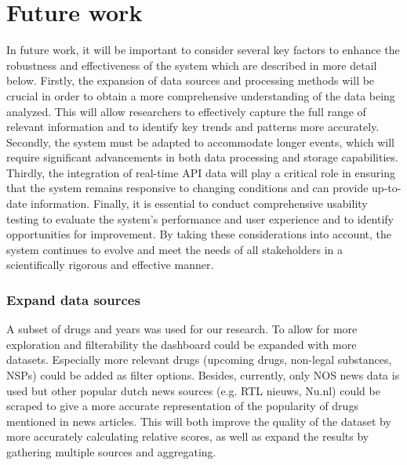 \section{Future work}

In future work, it will be important to consider several key factors to enhance the robustness and effectiveness of the system which are described in more detail below. Firstly, the expansion of data sources and processing methods will be crucial in order to obtain a more comprehensive understanding of the data being analyzed. This will allow researchers to effectively capture the full range of relevant information and to identify key trends and patterns more accurately. Secondly, the system must be adapted to accommodate longer events, which will require significant advancements in both data processing and storage capabilities. Thirdly, the integration of real-time API data will play a critical role in ensuring that the system remains responsive to changing conditions and can provide up-to-date information. Finally, it is essential to conduct comprehensive usability testing to evaluate the system's performance and user experience and to identify opportunities for improvement. By taking these considerations into account, the system continues to evolve and meet  the needs of all stakeholders in a scientifically rigorous and effective manner.

\subsubsection{Expand data sources}
A subset of drugs and years was used for our research. To allow for more exploration and filterability the dashboard could be expanded with more datasets. Especially more relevant drugs (upcoming drugs, non-legal substances, NSPs) could be added as filter options. Besides, currently, only NOS news data is used but other popular dutch news sources (e.g. RTL nieuws, Nu.nl) could be scraped to give a more accurate representation of the popularity of drugs mentioned in news articles. This will both improve the quality of the dataset by more accurately calculating relative scores, as well as expand the results by gathering multiple sources and aggregating.

